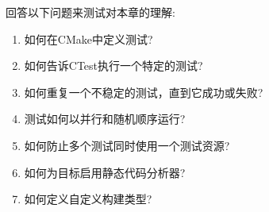 回答以下问题来测试对本章的理解:

\begin{enumerate}
\item 
如何在CMake中定义测试?

\item 
如何告诉CTest执行一个特定的测试?

\item 
如何重复一个不稳定的测试，直到它成功或失败?

\item 
测试如何以并行和随机顺序运行?

\item 
如何防止多个测试同时使用一个测试资源?

\item 
如何为目标启用静态代码分析器?

\item 
如何定义自定义构建类型?
\end{enumerate}